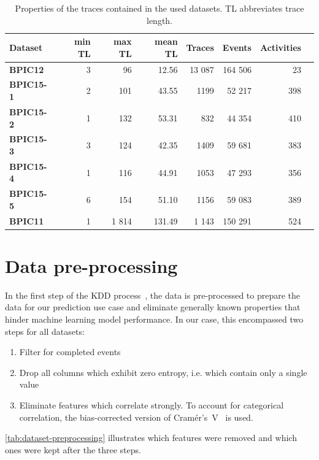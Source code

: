 \begin{table}[]
\centering
\begin{tabular}{lrrrrrrr}
\textbf{Dataset} & \textbf{min TL} & \textbf{max TL} &  \textbf{mean TL} & \textbf{Traces} & \textbf{Events} & \textbf{Activities} \\
\hline
\textbf{BPIC12} & 3 & 96 & 12.56 & 13 087 & 164 506 & 23\\
\textbf{BPIC15-1} & 2 & 101 & 43.55 & 1199 & 52 217 & 398\\
\textbf{BPIC15-2} & 1 & 132 & 53.31 & 832 & 44 354 & 410\\
\textbf{BPIC15-3} & 3 & 124 & 42.35 & 1409 & 59 681 & 383\\
\textbf{BPIC15-4} & 1 & 116 & 44.91 & 1053 & 47 293 & 356\\
\textbf{BPIC15-5} & 6 & 154 & 51.10 & 1156 & 59 083 & 389\\
\textbf{BPIC11} & 1 & 1 814 & 131.49 & 1 143 & 150 291 & 524\\
\end{tabular}
\caption[Trace properties in each dataset]{Properties of the traces contained in the used datasets. TL abbreviates trace length.}
\label{tab:dataset-characteristics}
\end{table}

\section{Data pre-processing}
\label{sec:eval:data-preprocessing}
In the first step of the KDD process~\cite{fayyad1996data}, the data is pre-processed to prepare the data for our prediction use case and eliminate generally known properties that hinder machine learning model performance. In our case, this encompassed two steps for all datasets:

\begin{enumerate}
    \item Filter for completed events
    \item Drop all columns which exhibit zero entropy, i.e. which contain only a single value
    \item Eliminate features which correlate strongly. To account for categorical correlation, the bias-corrected version of Cramér's~V~\cite{bergsma2013bias} is used.
\end{enumerate}

\autoref{tab:dataset-preprocessing} illustrates which features were removed and which ones were kept after the three steps.

